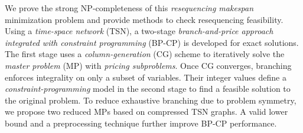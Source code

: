 \documentclass[12pt]{article}
\begin{document}
We prove the strong NP-completeness %
of this \textit{resequencing makespan} minimization problem and provide methods to check resequencing feasibility. Using a \textit{time-space network} (TSN), a two-stage \textit{branch-and-price approach integrated with constraint programming} (BP-CP) is developed for exact solutions. The first stage uses a \textit{column-generation} (CG) scheme to iteratively solve the \textit{master problem} (MP) with \textit{pricing subproblems}. Once CG converges, branching enforces integrality on only a subset of variables. Their integer values define a \textit{constraint-programming} model in the second stage to find a feasible solution to the original problem. To reduce exhaustive branching due to problem symmetry, we propose two reduced MPs based on compressed TSN graphs. A valid lower bound and a preprocessing technique further improve BP-CP performance.


\end{document}
